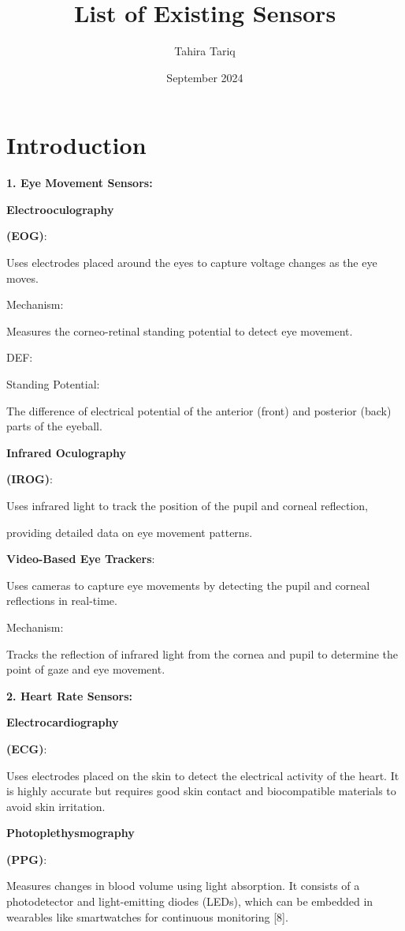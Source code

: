 \documentclass{article}
\title{List of Existing Sensors}
\author{Tahira Tariq}
\date{September 2024}
\begin{document}
\maketitle

\section{Introduction}

\textbf{1. Eye Movement Sensors:}

\textbf{Electrooculography}

\textbf{(EOG)}: 

Uses electrodes placed around the eyes to capture voltage changes as the eye moves.

Mechanism:

Measures the corneo-retinal standing potential to detect eye movement.

DEF: 

Standing Potential: 

The difference of electrical potential of the anterior (front) and posterior (back) parts of the eyeball.

\textbf{Infrared Oculography}

\textbf{(IROG)}: 

Uses infrared light to track the position of the pupil and corneal reflection, 

providing detailed data on eye movement patterns.

\textbf{Video-Based Eye Trackers}: 

Uses cameras to capture eye movements by detecting the pupil and corneal reflections in real-time.

Mechanism:

Tracks the reflection of infrared light from the cornea and pupil to determine the point of gaze and eye movement.

\textbf{2. Heart Rate Sensors:}

\textbf{Electrocardiography }

\textbf{(ECG)}: 

Uses electrodes placed on the skin to detect the electrical activity of the heart. It is highly accurate but requires good skin contact and biocompatible materials to avoid skin irritation.

\textbf{Photoplethysmography }

\textbf{(PPG)}: 

Measures changes in blood volume using light absorption. It consists of a photodetector and light-emitting diodes (LEDs), which can be embedded in wearables like smartwatches for continuous monitoring [8].
\end{document}
